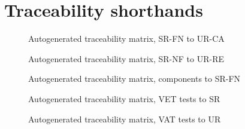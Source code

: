 \documentclass[a4paper,10pt]{article}
\begin{document}
  \section{Traceability shorthands}
  \begin{figure}[h]
    \centering\traceabilityFNCA
    \caption{Autogenerated traceability matrix, SR-FN to UR-CA}
  \end{figure}
  \begin{figure}[h]
    \centering\traceabilityNFRE
    \caption{Autogenerated traceability matrix, SR-NF to UR-RE}
  \end{figure}
  \begin{figure}[h]
    \centering\traceabilityCompFN
    \caption{Autogenerated traceability matrix, components to SR-FN}
  \end{figure}
  \begin{figure}[h]
    \centering\traceabilityVETSR
    \caption{Autogenerated traceability matrix, VET tests to SR}
  \end{figure}
  \begin{figure}[h]
    \centering\traceabilityVATUR
    \caption{Autogenerated traceability matrix, VAT tests to UR}
  \end{figure}
\end{document}
